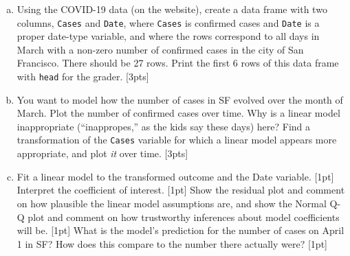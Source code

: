 \documentclass[12pt]{article}
\begin{document}
\begin{enumerate}[(a)]
	\item Using the COVID-19 data (on the website), create a data frame with two columns, \verb|Cases| and \verb|Date|, where \verb|Cases| is confirmed cases and \verb|Date| is a proper date-type variable, and where the rows correspond to all days in March with a non-zero number of confirmed cases in the city of San Francisco. There should be 27 rows. Print the first 6 rows of this data frame with \verb|head| for the grader. [3pts]
	\item You want to model how the number of cases in SF evolved over the month of March. Plot the number of confirmed cases over time. Why is a linear model inappropriate (``inappropes,'' as the kids say these days) here? Find a transformation of the \verb|Cases| variable for which a linear model appears more appropriate, and plot \textit{it} over time. [3pts]
	\item Fit a linear model to the transformed outcome and the Date variable. [1pt] Interpret the coefficient of interest. [1pt] Show the residual plot and comment on how plausible the linear model assumptions are, and show the Normal Q-Q plot and comment on how trustworthy inferences about model coefficients will be. [1pt] What is the model's prediction for the number of cases on April 1 in SF? How does this compare to the number there actually were? [1pt]
\end{enumerate}
\end{document}

